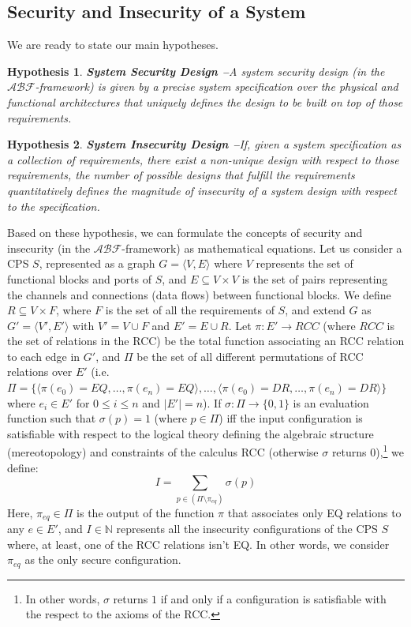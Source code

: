 \documentclass[runningheads]{llncs}
\newcommand{\assertionRegion}{\mathcal{A}}
\newcommand{\beliefRegion}{\mathcal{B}}
\newcommand{\factRegion}{\mathcal{F}}
\newcommand{\abftheory}{\assertionRegion\beliefRegion\factRegion}
\newtheorem{hypothesis}{Hypothesis}%
\begin{document}
\subsection{Security and Insecurity of a System}\label{sec:formula}
We are ready to state our main hypotheses.

\begin{hypothesis}{\bf System Security Design --}\label{hyp:security}
	A system security design (in the $\abftheory$-framework) is given by a
	precise system specification over the physical and functional
	architectures that uniquely defines the design to be built on top of those
	requirements.
\end{hypothesis}

\begin{hypothesis}{\bf System Insecurity Design --}\label{hyp:insecurity}
	If, given a system specification as a collection of requirements, there
	exist a non-unique design with respect to those requirements, the
	number of possible designs that fulfill the requirements
	quantitatively defines the magnitude of insecurity of a system design with respect to the specification.
\end{hypothesis}

Based on these hypothesis, we can formulate the concepts of security and
insecurity (in the $\abftheory$-framework) as mathematical equations.  Let us
consider a CPS $S$, represented as a graph $G=\langle V,E\rangle$ where $V$
represents the set of functional blocks and ports of $S$, and $E\subseteq
V\times V$ is the set of pairs representing the channels and connections (data
flows) between functional blocks. We define $R\subseteq V\times F$, where $F$
is the set of all the requirements of $S$,
and extend $G$ as $G'=\langle V',E'\rangle$ with $V'=V\cup F$ and $E'= E\cup R$. Let $\pi:
E'\rightarrow RCC$ (where $RCC$ is the set of relations in the RCC) be the
total function associating an RCC relation to each edge in $G'$, and $\Pi$ be
the set of all different permutations of RCC relations over $E'$ (i.e.
$\Pi=\{\langle\pi(e_0)=EQ,\ldots,\pi(e_n)=EQ\rangle,\ldots,\langle
\pi(e_0)=DR,\ldots,\pi(e_n)=DR\rangle\}$ where $e_i\in E'$ for $0\leq i \leq n$ and $|E'|=n$). If $\sigma:\Pi\rightarrow\{0,1\}$ is
an evaluation function such that $\sigma(p)=1$ (where $p\in\Pi$) iff the input
configuration is satisfiable with respect to the logical theory defining the
algebraic structure (mereotopology) and constraints of the calculus RCC
(otherwise $\sigma$ returns $0$),\footnote{In other words, $\sigma$ returns $1$
if and only if a configuration is satisfiable with the respect to the axioms of
the RCC.} we define:
\begin{displaymath}
	I=\sum_{p\in(\Pi\setminus\pi_{eq})} \sigma(p)
\end{displaymath}
Here, $\pi_{eq}\in\Pi$ is the output of the function $\pi$ that associates only EQ relations
to any $e\in E'$, and $I\in\mathbb{N}$ represents all the insecurity configurations
of the CPS $S$ where, at least, one of the RCC relations isn't EQ.
In other words, we consider $\pi_{eq}$ as the only secure configuration.
\end{document}
